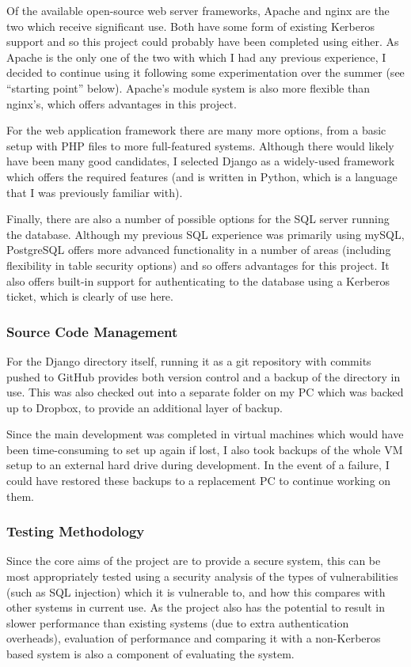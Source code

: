 \documentclass{article}
\begin{document}
Of the available open-source web server frameworks, Apache and nginx are the two which receive significant use. Both have some form of existing Kerberos support and so this project could probably have been completed using either. As Apache is the only one of the two with which I had any previous experience, I decided to continue using it following some experimentation over the summer (see ``starting point'' below). Apache's module system is also more flexible than nginx's, which offers advantages in this project.

For the web application framework there are many more options, from a basic setup with PHP files to more full-featured systems. Although there would likely have been many good candidates, I selected Django as a widely-used framework which offers the required features (and is written in Python, which is a language that I was previously familiar with).

Finally, there are also a number of possible options for the SQL server running the database. Although my previous SQL experience was primarily using mySQL, PostgreSQL offers more advanced functionality in a number of areas (including flexibility in table security options) and so offers advantages for this project. It also offers built-in support for authenticating to the database using a Kerberos ticket, which is clearly of use here.

\subsubsection{Source Code Management}
For the Django directory itself, running it as a git repository with commits pushed to GitHub provides both version control and a backup of the directory in use. This was also checked out into a separate folder on my PC which was backed up to Dropbox, to provide an additional layer of backup.

Since the main development was completed in virtual machines which would have been time-consuming to set up again if lost, I also took backups of the whole VM setup to an external hard drive during development. In the event of a failure, I could have restored these backups to a replacement PC to continue working on them.

\subsubsection{Testing Methodology}
Since the core aims of the project are to provide a secure system, this can be most appropriately tested using a security analysis of the types of vulnerabilities (such as SQL injection) which it is vulnerable to, and how this compares with other systems in current use. As the project also has the potential to result in slower performance than existing systems (due to extra authentication overheads), evaluation of performance and comparing it with a non-Kerberos based system is also a component of evaluating the system.
\end{document}
